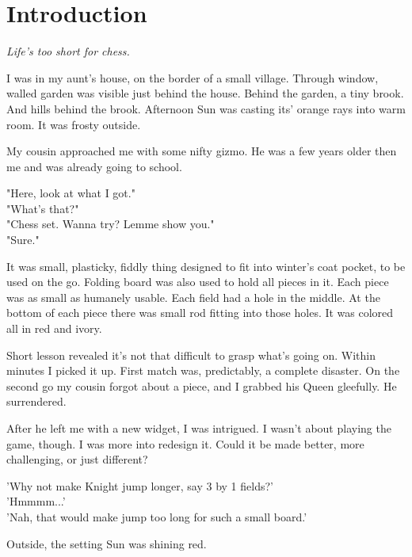 
\chapter*{Introduction}

\begin{flushright}
\parbox{0.6\textwidth}{
\emph{Life's too short for chess. \\
 } }
\end{flushright}

\noindent
I was in my aunt's house, on the border of a small village.
Through window, walled garden was visible just behind the house.
Behind the garden, a tiny brook. And hills behind the brook.
Afternoon Sun was casting its' orange rays into warm room. It
was frosty outside.

My cousin approached me with some nifty gizmo. He was a
few years older then me and was already going to school.

\noindent
"Here, look at what I got." \\
\hspace*{\fill}"What's that?" \\
"Chess set. Wanna try? Lemme show you." \\
\hspace*{\fill}"Sure."

It was small, plasticky, fiddly thing designed to fit into winter's
coat pocket, to be used on the go. Folding board was also used to
hold all pieces in it. Each piece was as small as humanely usable.
Each field had a hole in the middle. At the bottom of each piece
there was small rod fitting into those holes. It was colored all
in red and ivory.

Short lesson revealed it's not that difficult to grasp what's going
on. Within minutes I picked it up. First match was, predictably, a
complete disaster. On the second go my cousin forgot about a piece,
and I grabbed his Queen gleefully. He surrendered.

After he left me with a new widget, I was intrigued. I wasn't
about playing the game, though. I was more into redesign it. Could it
be made better, more challenging, or just different?

\noindent
'Why not make Knight jump longer, say 3 by 1 fields?' \\
'Hmmmm...' \\
'Nah, that would make jump too long for such a small board.'

Outside, the setting Sun was shining red.

\clearpage %
